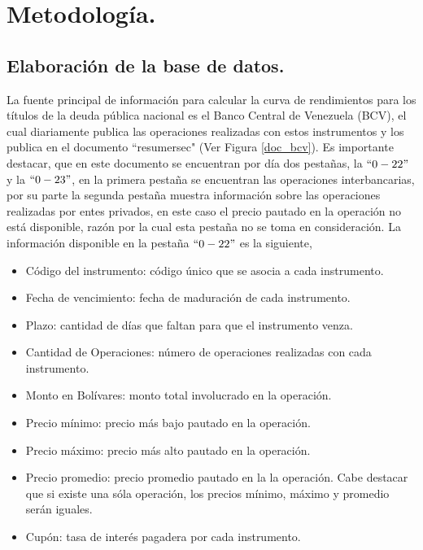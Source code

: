 \chapter{Metodolog\'ia.}

\section{Elaboraci\'on de la base de datos.}


\hspace{0.4cm} La fuente principal de informaci\'on para calcular la curva de rendimientos para los t\'itulos de la deuda p\'ublica nacional es el Banco Central de Venezuela (BCV), el cual diariamente publica las operaciones realizadas con estos instrumentos y los publica en el documento ``resumersec"\hspace{0.01cm}  (Ver Figura \ref{doc_bcv}). Es importante destacar, que en este documento se encuentran por d\'ia dos pesta\~nas, la $``0-22"$ y la $``0-23"$, en la primera pesta\~na se encuentran las operaciones interbancarias, por su parte la segunda pesta\~na muestra informaci\'on sobre las operaciones realizadas por entes privados, en este caso el precio pautado en la operaci\'on no est\'a disponible, raz\'on por la cual esta pesta\~na no se toma en consideraci\'on. La informaci\'on disponible en la pesta\~na $``0-22"$ es la siguiente,

\begin{itemize}
  \item C\'odigo del instrumento: c\'odigo \'unico que se asocia a cada instrumento.
  \item Fecha de vencimiento: fecha de maduraci\'on de cada instrumento.
  \item Plazo: cantidad de d\'ias que faltan para que el instrumento venza.
  \item Cantidad de Operaciones: n\'umero de operaciones realizadas con cada instrumento.
  \item Monto en Bol\'ivares: monto total involucrado en la operaci\'on.
  \item Precio m\'inimo: precio m\'as bajo pautado en la operaci\'on.
  \item Precio m\'aximo: precio m\'as alto pautado en la operaci\'on.
  \item Precio promedio: precio promedio pautado en la la operaci\'on. Cabe destacar que si existe una s\'ola operaci\'on, los precios m\'inimo, m\'aximo y promedio ser\'an iguales.
  \item Cup\'on: tasa de inter\'es pagadera por cada instrumento.
\end{itemize}


